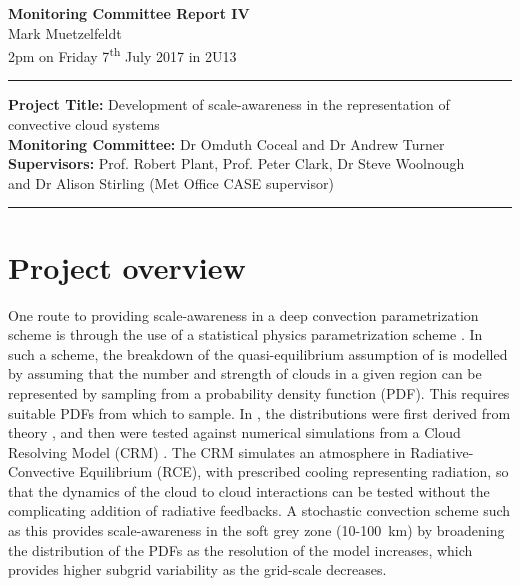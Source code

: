 \documentclass[11pt,a4paper]{article}
\newcommand{\ts}{\textsuperscript}
\begin{document}

\begin{center}
    \Large{\textbf{Monitoring Committee Report IV}}\\[0.1cm]
    \large{Mark Muetzelfeldt}\\
    \normalsize{2pm on Friday 7\ts{th} July 2017 in 2U13}\\[0.1cm]		
    \rule{\textwidth}{0.2mm}
    \textbf{Project Title: }Development of scale-awareness in the representation of
    convective cloud systems\\
    \textbf{Monitoring Committee: }Dr Omduth Coceal and  Dr Andrew Turner\\
    \textbf{Supervisors: }Prof. Robert Plant, Prof. Peter Clark, Dr Steve Woolnough \\
    and Dr Alison Stirling (Met Office CASE supervisor)\\
    \rule{\textwidth}{0.2mm}
\end{center}

\section{Project overview}
\label{sec:Project Overview}

One route to providing scale-awareness in a deep convection parametrization scheme is through the use of a statistical physics parametrization scheme \parencite{plant2008stochastic}. In such a scheme, the breakdown of the quasi-equilibrium assumption of \cite{arakawa1974interaction} is modelled by assuming that the number and strength of clouds in a given region can be represented by sampling from a probability density function (PDF). This requires suitable PDFs from which to sample. In \cite{plant2008stochastic}, the distributions were first derived from theory \parencite{craig2006fluctuations}, and then were tested against numerical simulations from a Cloud Resolving Model (CRM) \parencite{cohen2006fluctuations}. The CRM simulates an atmosphere in Radiative-Convective Equilibrium (RCE), with prescribed cooling representing radiation, so that the dynamics of the cloud to cloud interactions can be tested without the complicating addition of radiative feedbacks. A stochastic convection scheme such as this provides scale-awareness in the soft grey zone (\SI{10}{}-\SI{100}{km}) by broadening the distribution of the PDFs as the resolution of the model increases, which provides higher subgrid variability as the grid-scale decreases.
\end{document}
